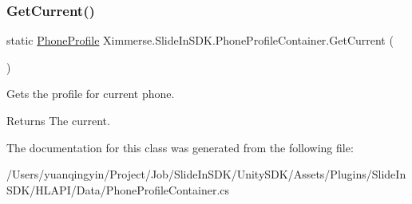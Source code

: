 \subsubsection{\texorpdfstring{Get\+Current()}{GetCurrent()}}
{\footnotesize\ttfamily static \mbox{\hyperlink{class_ximmerse_1_1_slide_in_s_d_k_1_1_phone_profile}{Phone\+Profile}} Ximmerse.\+Slide\+In\+S\+D\+K.\+Phone\+Profile\+Container.\+Get\+Current (\begin{DoxyParamCaption}{ }\end{DoxyParamCaption})\hspace{0.3cm}{\ttfamily [static]}}



Gets the profile for current phone. 

\begin{DoxyReturn}{Returns}
The current.
\end{DoxyReturn}


The documentation for this class was generated from the following file\+:\begin{DoxyCompactItemize}
\item 
/\+Users/yuanqingyin/\+Project/\+Job/\+Slide\+In\+S\+D\+K/\+Unity\+S\+D\+K/\+Assets/\+Plugins/\+Slide\+In\+S\+D\+K/\+H\+L\+A\+P\+I/\+Data/Phone\+Profile\+Container.\+cs\end{DoxyCompactItemize}
